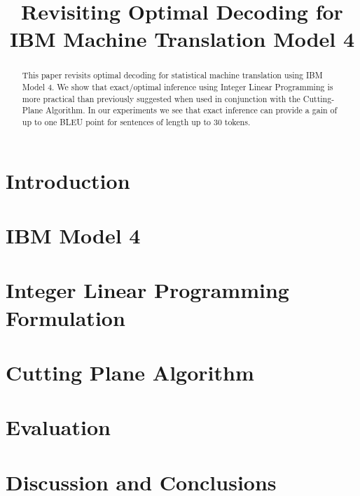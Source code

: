 \documentclass[english,11pt]{article}
\title{Revisiting Optimal Decoding for IBM Machine Translation Model 4}
\date{}
\theoremstyle{plain}
\theoremstyle{plain}
\theoremstyle{plain}
\begin{document}
\maketitle
\begin{abstract}
  This paper revisits optimal decoding for statistical machine
  translation using IBM Model 4.  We show that exact/optimal inference
  using Integer Linear Programming is more practical than previously
  suggested when used in conjunction with the Cutting-Plane Algorithm.
  In our experiments we see that exact inference can provide a gain of
  up to one BLEU point for sentences of length up to 30 tokens.
\end{abstract}

\section{Introduction}
\label{sec:introduction}


\section{IBM Model 4} 
\label{sec:ibm-model-4}
 
 
\section{Integer Linear Programming Formulation}
\label{sec:ilp}


\section{Cutting Plane Algorithm}
\label{sec:cutting-plane}


\section{Evaluation}
\label{sec:evaluation}


\section{Discussion and Conclusions}
\label{sec:conclusion}



\small

\end{document}
